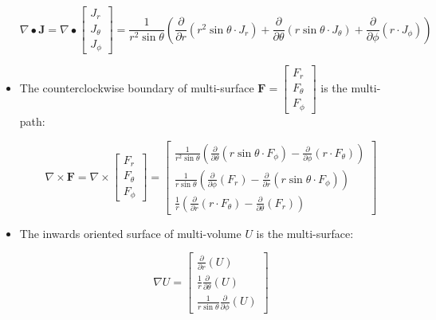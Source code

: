 \documentclass{book}
\begin{document}
\begin{itemize}
\[\nabla \bullet \mathbf{J} = \nabla \bullet \begin{bmatrix} J_r \\ J_\theta \\ J_\phi \end{bmatrix} = \frac{1}{r^2 \sin\theta}\left(\frac{\partial}{\partial r}(r^2 \sin\theta \cdot J_r) + \frac{\partial}{\partial \theta}(r \sin\theta \cdot J_\theta) + \frac{\partial}{\partial \phi}(r \cdot J_\phi)\right)\]
\item The counterclockwise boundary of multi-surface \(\mathbf{F} = \begin{bmatrix} F_r \\ F_\theta \\ F_\phi \end{bmatrix}\) is the multi-path:

\[\nabla \times \mathbf{F} = \nabla \times \begin{bmatrix} F_r \\ F_\theta \\ F_\phi \end{bmatrix} = \begin{bmatrix} 
\frac{1}{r^2\sin\theta}\left(\frac{\partial}{\partial \theta}(r\sin\theta \cdot F_\phi) - \frac{\partial}{\partial \phi}(r \cdot F_\theta) \right) \\ 
\frac{1}{r\sin\theta}\left(\frac{\partial}{\partial \phi}(F_r) - \frac{\partial}{\partial r}(r\sin\theta \cdot F_\phi)\right) \\ 
\frac{1}{r}\left(\frac{\partial}{\partial r}(r \cdot F_\theta) - \frac{\partial}{\partial \theta}(F_r)\right) \end{bmatrix}\]
\item The inwards oriented surface of multi-volume \(U\) is the multi-surface:

\[\nabla U = \begin{bmatrix} \frac{\partial}{\partial r}(U) \\ \frac{1}{r}\frac{\partial}{\partial \theta}(U) \\ \frac{1}{r\sin\theta}\frac{\partial}{\partial \phi}(U) \end{bmatrix}\]
\end{itemize}



\end{document}
